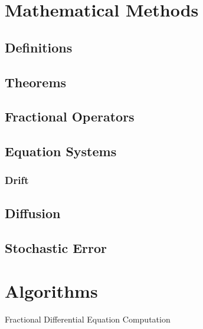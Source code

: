 \section{Mathematical Methods}

\subsection{Definitions}

\subsection{Theorems}


\subsection{Fractional Operators}

\begin{enumerate}
\end{enumerate}


\subsection{Equation Systems}

\subsubsection{Drift}

\subsection{Diffusion}

\subsection{Stochastic Error}


\section{Algorithms}
\begin{algorithm}[H]
\begin{algorithmic}[1]
\end{algorithmic}
\caption{Fractional Differential Equation Computation}
	\label{Algorithm_1}
\end{algorithm}

